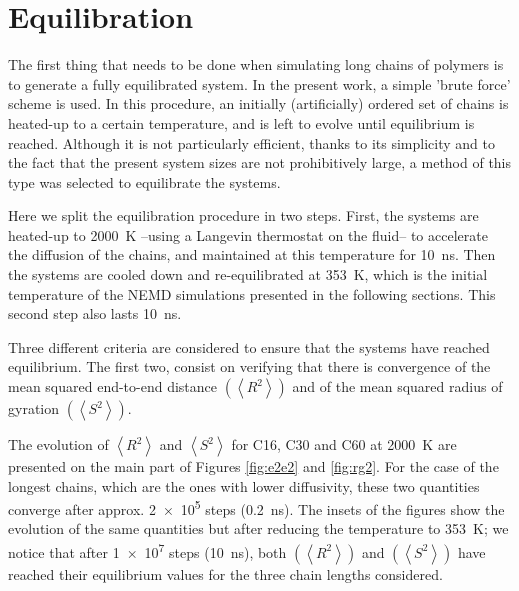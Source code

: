 \documentclass[aps,prb,reprint,superscriptaddress, a4paper]{revtex4-1}
\begin{document}
\section{Equilibration}
\label{sec:eq}


The first thing that needs to be done when simulating long chains of polymers is to generate a fully equilibrated system. In the present work, a simple 'brute force' scheme is used. In this procedure, an initially (artificially) ordered set of chains is heated-up to  a certain temperature, and is left to evolve until equilibrium is reached. Although it is not particularly efficient,  thanks to its simplicity and to the fact that the present system sizes are not prohibitively large, a method of this type was selected to equilibrate the systems. 

Here we split the equilibration procedure in two steps. First, the systems are heated-up to \SI{2000}{\kelvin}  --using a Langevin thermostat on the fluid-- to accelerate the diffusion of the chains, and maintained at this temperature for \SI{10}{\nano\second}.  Then the systems are cooled down and re-equilibrated at  \SI{353}{\kelvin}, which is the initial temperature of the NEMD simulations presented in the following sections. This second step also lasts  \SI{10}{\nano\second}.

Three different criteria are considered to ensure that the systems have reached equilibrium. The first two, consist on verifying that there is convergence of the mean squared end-to-end distance $\left(\left< R^2 \right> \right)$ and of  the mean squared radius of gyration $\left(\left< S^2 \right> \right)$.

The evolution of $\left< R^2 \right>$ and   $\left< S^2 \right>$  for C16, C30 and C60 at \SI{2000}{\kelvin}   are presented on the main part of  Figures  \ref{fig:e2e2} and \ref{fig:rg2}. For the case of the longest chains, which are the ones with lower diffusivity,  these two quantities converge after approx. \SI{2e5}{} steps (\SI{0.2}{\nano\second}). The insets of the figures show the evolution of the same quantities but after reducing the temperature to    \SI{353}{\kelvin}; we notice that after \SI{1e7}{} steps (\SI{10}{\nano\second}), both $\left(\left< R^2 \right> \right)$ and   $\left(\left< S^2 \right> \right)$ have reached their equilibrium values for the three  chain lengths considered.
\end{document}
